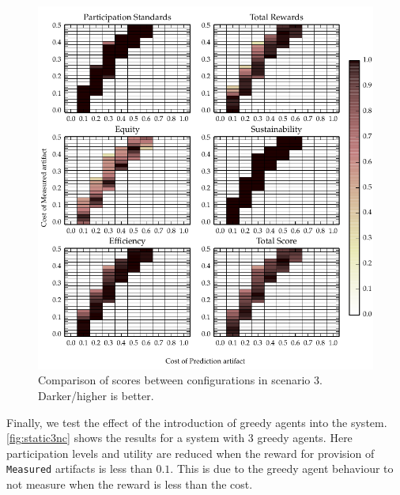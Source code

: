 \begin{figure}
\includegraphics{gfx/kc/static_highfixed_1.pdf} 
\caption[Comparison of scores between configurations in scenario 3.]{Comparison of scores between configurations in scenario 3. Darker/higher is better.}\label{fig:static_highfixed_1}
\end{figure}

Finally, we test the effect of the introduction of greedy agents into
the system. \autoref{fig:static3nc} shows the results for a system with 3 greedy agents. Here participation levels and utility are reduced when the
reward for provision of \texttt{Measured} artifacts is less than $0.1$. This is
due to the greedy agent behaviour to not measure when the reward is
less than the cost.

